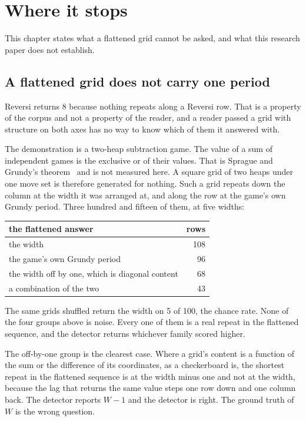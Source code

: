 \chapter{Where it stops}

This chapter states what a flattened grid cannot be asked, and what this research paper does not
establish.

\section{A flattened grid does not carry one period}

Reversi returns 8 because nothing repeats along a Reversi row. That is a property of the corpus and
not a property of the reader, and a reader passed a grid with structure on both axes has no way to
know which of them it answered with.

The demonstration is a two-heap subtraction game. The value of a sum of independent games is the
exclusive or of their values. That is Sprague and Grundy's theorem~\cite{src:Sprague-1935,src:Grundy-1939} and is not measured here. A square
grid of two heaps under one move set is therefore generated for nothing. Such a grid repeats down the column at the
width it was arranged at, and along the row at the game's own Grundy period. Three hundred and
fifteen of them, at five widths:

\begin{center}
\begin{tabular}{@{}lr@{}}
\toprule
the flattened answer & rows \\
\midrule
the width & 108 \\
the game's own Grundy period & 96 \\
the width off by one, which is diagonal content & 68 \\
a combination of the two & 43 \\
\bottomrule
\end{tabular}
\end{center}

The same grids shuffled return the width on 5 of 100, the chance rate. None of the four groups above
is noise. Every one of them is a real repeat in the flattened sequence, and the detector
returns whichever family scored higher.

The off-by-one group is the clearest case. Where a grid's content is a function of the sum or the
difference of its coordinates, as a checkerboard is, the shortest repeat in the flattened sequence is
at the width minus one and not at the width, because the lag that returns the same value steps one
row down and one column back. The detector reports \(W-1\) and the detector is right. The ground
truth of \(W\) is the wrong question.

